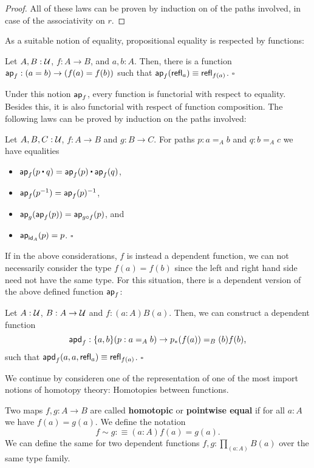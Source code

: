 \begin{proof}
All of these laws can be proven by induction on of the paths involved,
in case of the associativity on $r$.
\end{proof}

As a suitable notion of equality, propositional equality is respected by
functions:
\begin{lemma}
Let $A, B : \mathcal{U}$, $f : A \to B$, and $a, b : A$. Then, there is a function
$\mathsf{ap}_f : (a = b) \to (f(a) = f(b))$ such that $\mathsf{ap}_f(\mathsf{refl}_a) \equiv \mathsf{refl}_{f(a)}$.
\hfill $\square$
\end{lemma}

Under this notion $\mathsf{ap}_f$, every function is functorial with respect to
equality.
Besides this, it is also functorial with respect of function composition.
The following laws can be proved by induction on the paths involved:
\begin{lemma}
Let $A, B, C : \mathcal{U}$, $f : A \to B$ and $g : B \to C$. For paths $p : a =_A b$ and
$q : b =_A c$ we have equalities
\begin{itemize}
\item $\ap_f(p \ct q) = \ap_f(p) \ct \ap_f(q)$,
\item $\mathsf{ap}_f(p^{-1}) = \mathsf{ap}_f(p)^{-1}$,
\item $\mathsf{ap}_g(\mathsf{ap}_f(p)) = \mathsf{ap}_{g \circ f}(p)$, and
\item $\mathsf{ap}_{\mathsf{id}_A}(p) = p$. \hfill $\square$
\end{itemize}
\end{lemma}

If in the above considerations, $f$ is instead a dependent function, we can not
necessarily consider the type $f(a) = f(b)$ since the left and right hand side
need not have the same type.
For this situation, there is a dependent version of the above defined function
$\mathsf{ap}_f$:
\begin{lemma}\label{thm:apd-hott}
Let $A : \mathcal{U}$, $B : A \to \mathcal{U}$ and $f : (a : A) B(a)$. Then, we can construct
a dependent function
\begin{equation*}
\mathsf{apd}_f : \{a, b\}(p : a =_A b) \to p_*(f(a)) =_B(b) f(b) \text{,}
\end{equation*}
such that $\mathsf{apd}_f(a, a, \mathsf{refl}_a) \equiv \mathsf{refl}_{f(a)}$. \hfill $\square$
\end{lemma}

We continue by consideren one of the representation of one of the most import
notions of homotopy theory:
Homotopies between functions.
\begin{defn}\label{def:tt-htpy}
Two maps $f, g : A \to B$ are called \textbf{homotopic} or \textbf{pointwise equal}
if for all $a : A$ we have
$f(a) = g(a)$.
We define the notation
\begin{equation*}
f \sim g :\equiv (a : A) f(a) = g(a) \text{.}
\end{equation*}
We can define the same for two dependent functions $f, g : \prod_{(a : A)} B(a)$
over the same type family.
\end{defn}

